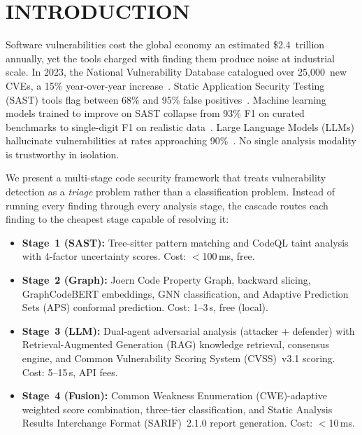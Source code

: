 
\chapter{\uppercase{Introduction}}
\setcounter{page}{1}

Software vulnerabilities cost the global economy an estimated \$2.4~trillion annually, yet the tools charged with finding them produce noise at industrial scale. In 2023, the National Vulnerability Database catalogued over 25,000~new CVEs, a 15\% year-over-year increase~\cite{nvd2023}. Static Application Security Testing (SAST) tools flag between 68\% and 95\% false positives~\cite{ghostsecurity2025, siftingnoise2026}. Machine learning models trained to improve on SAST collapse from 93\% F1 on curated benchmarks to single-digit F1 on realistic data~\cite{realvul2024, primevul2024}. Large Language Models (LLMs) hallucinate vulnerabilities at rates approaching 90\%~\cite{llm4vuln2024}. No single analysis modality is trustworthy in isolation.

We present a multi-stage code security framework that treats vulnerability detection as a \textit{triage} problem rather than a classification problem. Instead of running every finding through every analysis stage, the cascade routes each finding to the cheapest stage capable of resolving it:

\begin{itemize}
    \item \textbf{Stage~1 (SAST):} Tree-sitter pattern matching and CodeQL taint analysis with 4-factor uncertainty scores. Cost: $<$100\,ms, free.
    \item \textbf{Stage~2 (Graph):} Joern Code Property Graph, backward slicing, GraphCodeBERT embeddings, GNN classification, and Adaptive Prediction Sets (APS) conformal prediction. Cost: 1--3\,s, free (local).
    \item \textbf{Stage~3 (LLM):} Dual-agent adversarial analysis (attacker + defender) with Retrieval-Augmented Generation (RAG) knowledge retrieval, consensus engine, and Common Vulnerability Scoring System (CVSS)~v3.1 scoring. Cost: 5--15\,s, API fees.
    \item \textbf{Stage~4 (Fusion):} Common Weakness Enumeration (CWE)-adaptive weighted score combination, three-tier classification, and Static Analysis Results Interchange Format (SARIF)~2.1.0 report generation. Cost: $<$10\,ms.
\end{itemize}


